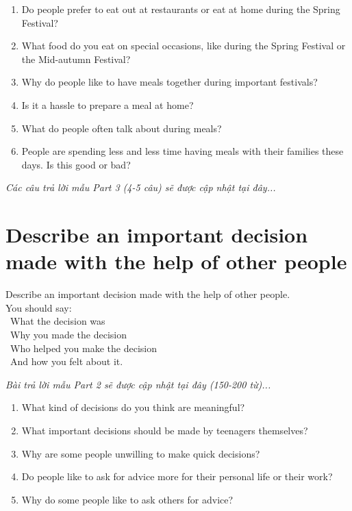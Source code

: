 \begin{ieltsprompt}
\begin{enumerate}[itemsep=4pt]
    \item Do people prefer to eat out at restaurants or eat at home during the Spring Festival?
    \item What food do you eat on special occasions, like during the Spring Festival or the Mid-autumn Festival?
    \item Why do people like to have meals together during important festivals?
    \item Is it a hassle to prepare a meal at home?
    \item What do people often talk about during meals?
    \item People are spending less and less time having meals with their families these days. Is this good or bad?
\end{enumerate}
\end{ieltsprompt}

\vspace{1em}
\textit{Các câu trả lời mẫu Part 3 (4-5 câu) sẽ được cập nhật tại đây...}
\vspace{2em}

\section{Describe an important decision made with the help of other people}
\begin{ieltsprompt}
Describe an important decision made with the help of other people. \\
You should say: \\
\textbullet\ What the decision was \\
\textbullet\ Why you made the decision \\
\textbullet\ Who helped you make the decision \\
\textbullet\ And how you felt about it. \\
\end{ieltsprompt}

\vspace{1em}
\textit{Bài trả lời mẫu Part 2 sẽ được cập nhật tại đây (150-200 từ)...}
\vspace{2em}

\begin{ieltsprompt}
\begin{enumerate}[itemsep=4pt]
    \item What kind of decisions do you think are meaningful?
    \item What important decisions should be made by teenagers themselves?
    \item Why are some people unwilling to make quick decisions?
    \item Do people like to ask for advice more for their personal life or their work?
    \item Why do some people like to ask others for advice?
\end{enumerate}
\end{ieltsprompt}

